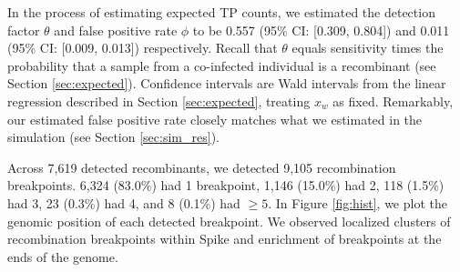 \documentclass[11pt,oneside,letterpaper]{article}
\begin{document}
In the process of estimating expected TP counts, we estimated the detection factor $\theta$ and false positive rate $\phi$ to be 0.557 (95\% CI: [0.309, 0.804]) and 0.011 (95\% CI: [0.009, 0.013]) respectively. Recall that $\theta$ equals sensitivity times the probability that a sample from a co-infected individual is a recombinant (see Section \ref{sec:expected}). Confidence intervals are Wald intervals from the linear regression described in Section \ref{sec:expected}, treating $x_w$ as fixed. Remarkably, our estimated false positive rate closely matches what we estimated in the simulation (see Section \ref{sec:sim_res}).



Across 7,619 detected recombinants, we detected 9,105 recombination breakpoints. 6,324 (83.0\%) had 1 breakpoint, 1,146 (15.0\%) had 2, 118 (1.5\%) had 3, 23 (0.3\%) had 4, and 8 (0.1\%) had $\geq 5$. In Figure \ref{fig:hist}, we plot the genomic position of each detected breakpoint. We observed localized clusters of recombination breakpoints within Spike and enrichment of breakpoints at the ends of the genome.
\end{document}
